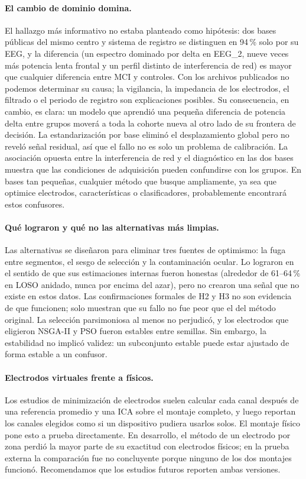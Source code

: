 \paragraph{El cambio de dominio domina.} El hallazgo más informativo no estaba planteado como hipótesis: dos bases públicas del mismo centro y sistema de registro se distinguen en 94\,\% solo por su EEG, y la diferencia (un espectro dominado por delta en EEG\_2, nueve veces más potencia lenta frontal y un perfil distinto de interferencia de red) es mayor que cualquier diferencia entre MCI y controles. Con los archivos publicados no podemos determinar su causa; la vigilancia, la impedancia de los electrodos, el filtrado o el periodo de registro son explicaciones posibles. Su consecuencia, en cambio, es clara: un modelo que aprendió una pequeña diferencia de potencia delta entre grupos moverá a toda la cohorte nueva al otro lado de su frontera de decisión. La estandarización por base eliminó el desplazamiento global pero no reveló señal residual, así que el fallo no es solo un problema de calibración. La asociación opuesta entre la interferencia de red y el diagnóstico en las dos bases muestra que las condiciones de adquisición pueden confundirse con los grupos. En bases tan pequeñas, cualquier método que busque ampliamente, ya sea que optimice electrodos, características o clasificadores, probablemente encontrará estos confusores.

\paragraph{Qué lograron y qué no las alternativas más limpias.} Las alternativas se diseñaron para eliminar tres fuentes de optimismo: la fuga entre segmentos, el sesgo de selección y la contaminación ocular. Lo lograron en el sentido de que sus estimaciones internas fueron honestas (alrededor de 61--64\,\% en LOSO anidado, nunca por encima del azar), pero no crearon una señal que no existe en estos datos. Las confirmaciones formales de H2 y H3 no son evidencia de que funcionen; solo muestran que su fallo no fue peor que el del método original. La selección parsimoniosa al menos no perjudicó, y los electrodos que eligieron NSGA-II y PSO fueron estables entre semillas. Sin embargo, la estabilidad no implicó validez: un subconjunto estable puede estar ajustado de forma estable a un confusor.

\paragraph{Electrodos virtuales frente a físicos.} Los estudios de minimización de electrodos suelen calcular cada canal después de una referencia promedio y una ICA sobre el montaje completo, y luego reportan los canales elegidos como si un dispositivo pudiera usarlos solos. El montaje físico pone esto a prueba directamente. En desarrollo, el método de un electrodo por zona perdió la mayor parte de su exactitud con electrodos físicos; en la prueba externa la comparación fue no concluyente porque ninguno de los dos montajes funcionó. Recomendamos que los estudios futuros reporten ambas versiones.

